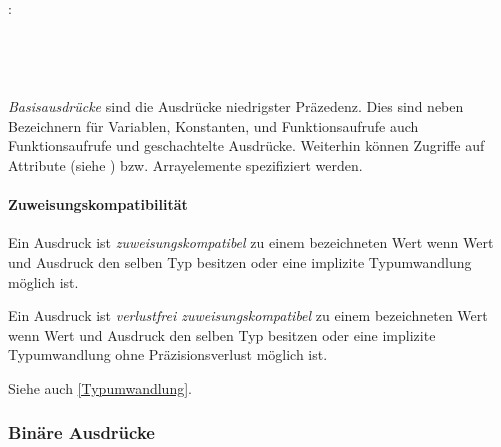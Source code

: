 \hspace*{1cm} \\
\hspace*{1cm}  \\
:\label{attribut_liste_oder_array_element}\\
\hspace*{1cm}\glq{}\grq  {} \\
\hspace*{1cm}\glq{}\grq  {}  \\
\hspace*{1cm}\glq\Gt{[}\grq  {}  \glq\Gt{]}\grq \\
\hspace*{1cm}\glq\Gt{[}\grq  {}  \glq\Gt{]}\grq {} \\

\emph{Basisausdrücke} sind die Ausdrücke niedrigster Präzedenz. Dies sind neben Bezeichnern
für Variablen, Konstanten, und Funktionsaufrufe auch Funktionsaufrufe und geschachtelte Ausdrücke.
Weiterhin können Zugriffe auf Attribute (siehe ) bzw. Arrayelemente spezifiziert werden.


\paragraph{Zuweisungskompatibilität}\label{Zuweisungskompatibilitaet}

Ein Ausdruck ist \emph{zuweisungskompatibel} zu einem bezeichneten Wert wenn
Wert und Ausdruck den selben Typ besitzen oder eine implizite Typumwandlung
möglich ist.

Ein Ausdruck ist \emph{verlustfrei zuweisungskompatibel} zu einem bezeichneten Wert
wenn Wert und Ausdruck den selben Typ besitzen oder eine implizite Typumwandlung
ohne Präzisionsverlust möglich ist.

Siehe auch \ref{Typumwandlung}.


\subsubsection{Binäre Ausdrücke}\label{Binaere Ausdruecke}

